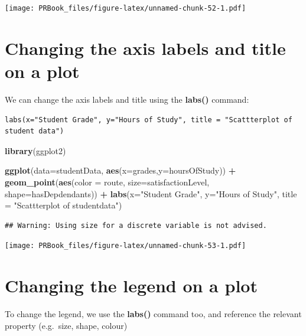 \documentclass[
]{book}
\newenvironment{Shaded}{\begin{snugshade}}{\end{snugshade}}
\newcommand{\DataTypeTok}[1]{\textcolor[rgb]{0.13,0.29,0.53}{#1}}
\newcommand{\KeywordTok}[1]{\textcolor[rgb]{0.13,0.29,0.53}{\textbf{#1}}}
\newcommand{\NormalTok}[1]{#1}
\newcommand{\OperatorTok}[1]{\textcolor[rgb]{0.81,0.36,0.00}{\textbf{#1}}}
\newcommand{\StringTok}[1]{\textcolor[rgb]{0.31,0.60,0.02}{#1}}
\begin{document}
\texttt{[image: PRBook\_files/figure-latex/unnamed-chunk-52-1.pdf]}

\hypertarget{changing-the-axis-labels-and-title-on-a-plot}{%
\section{Changing the axis labels and title on a plot}\label{changing-the-axis-labels-and-title-on-a-plot}}

We can change the axis labels and title using the \textbf{labs()} command:

\begin{verbatim}
labs(x="Student Grade", y="Hours of Study", title = "Scattterplot of student data")
\end{verbatim}

\begin{Shaded}
\begin{Highlighting}[]
\KeywordTok{library}\NormalTok{(ggplot2)}

\KeywordTok{ggplot}\NormalTok{(}\DataTypeTok{data=}\NormalTok{studentData, }\KeywordTok{aes}\NormalTok{(}\DataTypeTok{x=}\NormalTok{grades,}\DataTypeTok{y=}\NormalTok{hoursOfStudy)) }\OperatorTok{+}\StringTok{ }\KeywordTok{geom_point}\NormalTok{(}\KeywordTok{aes}\NormalTok{(}\DataTypeTok{color =}\NormalTok{ route, }\DataTypeTok{size=}\NormalTok{satisfactionLevel, }\DataTypeTok{shape=}\NormalTok{hasDepdendants)) }\OperatorTok{+}\StringTok{ }\KeywordTok{labs}\NormalTok{(}\DataTypeTok{x=}\StringTok{"Student Grade"}\NormalTok{, }\DataTypeTok{y=}\StringTok{"Hours of Study"}\NormalTok{, }\DataTypeTok{title =} \StringTok{"Scattterplot of studentdata"}\NormalTok{)}
\end{Highlighting}
\end{Shaded}

\begin{verbatim}
## Warning: Using size for a discrete variable is not advised.
\end{verbatim}

\texttt{[image: PRBook\_files/figure-latex/unnamed-chunk-53-1.pdf]}

\hypertarget{changing-the-legend-on-a-plot}{%
\section{Changing the legend on a plot}\label{changing-the-legend-on-a-plot}}

To change the legend, we use the \textbf{labs()} command too, and reference the relevant property (e.g.~size, shape, colour)
\end{document}
